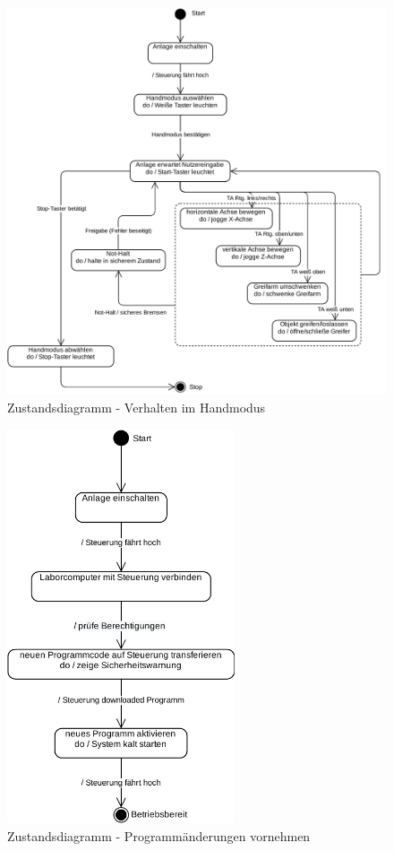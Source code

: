 \documentclass[../../../Bachelorarbeit.tex]{subfiles}
\begin{document}
\begin{figure}[H]
    \centering
    \includegraphics[width=\textwidth]{Images/hand_zustand.pdf}
    \caption[Zustandsdiagramm Handmodus]{Zustandsdiagramm - Verhalten im Handmodus}
    \label{fig:my-img5}
\end{figure}

\begin{figure}[H]
    \centering
    \includegraphics[width=0.6\textwidth]{Images/programm_zustand.pdf}
    \caption[Zustandsdiagramm Programmänderungen]{Zustandsdiagramm - Programmänderungen vornehmen}
    \label{fig:my-img6}
\end{figure}
\end{document}

